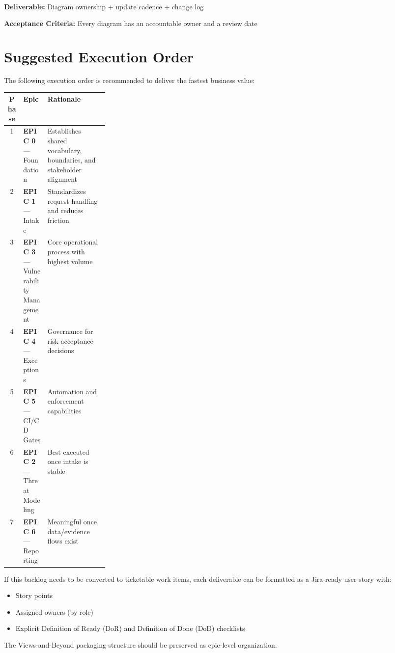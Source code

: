 \documentclass[11pt,letterpaper]{article}
\newcommand{\storyfield}[2]{\textbf{#1:} #2}
\begin{document}
\begin{storycard}
\storyfield{Deliverable}{Diagram ownership + update cadence + change log}

\storyfield{Acceptance Criteria}{Every diagram has an accountable owner and a review date}
\end{storycard}

\newpage

\section{Suggested Execution Order}

The following execution order is recommended to deliver the fastest business value:

\begin{center}
\begin{tabularx}{\linewidth}{@{}c>{\raggedright\arraybackslash}p{0.24\linewidth}>{\raggedright\arraybackslash}X@{}}
\toprule
\textbf{Phase} & \textbf{Epic} & \textbf{Rationale} \\
\midrule
1 & \textbf{EPIC 0} --- Foundation & Establishes shared vocabulary, boundaries, and stakeholder alignment \\
2 & \textbf{EPIC 1} --- Intake & Standardizes request handling and reduces friction \\
3 & \textbf{EPIC 3} --- Vulnerability Management & Core operational process with highest volume \\
4 & \textbf{EPIC 4} --- Exceptions & Governance for risk acceptance decisions \\
5 & \textbf{EPIC 5} --- CI/CD Gates & Automation and enforcement capabilities \\
6 & \textbf{EPIC 2} --- Threat Modeling & Best executed once intake is stable \\
7 & \textbf{EPIC 6} --- Reporting & Meaningful once data/evidence flows exist \\
\bottomrule
\end{tabularx}
\end{center}

\vspace{1cm}

\begin{infobox}
If this backlog needs to be converted to ticketable work items, each deliverable can be formatted as a Jira-ready user story with:
\begin{itemize}[nosep]
    \item Story points
    \item Assigned owners (by role)
    \item Explicit Definition of Ready (DoR) and Definition of Done (DoD) checklists
\end{itemize}
The Views-and-Beyond packaging structure should be preserved as epic-level organization.
\end{infobox}
\end{document}
